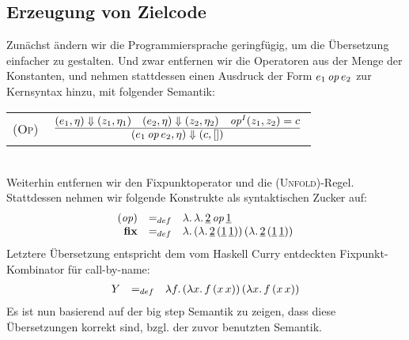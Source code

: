 \documentclass[12pt,fleqn]{article}
\newcommand{\RN}[1]{\mbox{\textsc{(#1)}}}
\begin{document}
\subsection{Erzeugung von Zielcode}

Zun\"achst \"andern wir die Programmiersprache geringf\"ugig, um die \"Ubersetzung einfacher zu gestalten. Und
zwar entfernen wir die Operatoren aus der Menge der Konstanten, und nehmen stattdessen einen Ausdruck der
Form $e_1\,{\text{\it op\/}}\,e_2$ zur Kernsyntax hinzu, mit folgender Semantik: \\[5mm]
\begin{tabular}{ll}
  \RN{Op} & $\regel{(e_1,\eta) \Downarrow (z_1,\eta_1) \quad (e_2,\eta) \Downarrow (z_2,\eta_2)
                    \quad \op^I(z_1,z_2)=c}
                   {(e_1\,\op\,e_2,\eta) \Downarrow (c,[])}$
\end{tabular} \\[5mm]
Weiterhin entfernen wir den Fixpunktoperator und die \RN{Unfold}-Regel. Stattdessen nehmen wir folgende
Konstrukte als syntaktischen Zucker auf:
\[\begin{array}{rcl}
  ({\text{\it op\/}}) &=_{def}& \lambda .\,\lambda .\,\underline{2}\,{\text{\it op\/}}\,\underline{1} \\
  \mathbf{fix} &=_{def}& \lambda .\,(\lambda .\,\underline{2}\,(\underline{1}\,\underline{1}))\,(\lambda .\,\underline{2}\,(\underline{1}\,\underline{1}))
\end{array}\]
Letztere \"Ubersetzung entspricht dem vom Haskell Curry entdeckten Fixpunkt-Kombinator f\"ur call-by-name:
\[\begin{array}{rcl}
  Y &=_{def}& \lambda f.\,(\lambda x.\,f\,(x\,x))\,(\lambda x.\,f\,(x\,x))
\end{array}\]
Es ist nun basierend auf der big step Semantik zu zeigen, dass diese \"Ubersetzungen korrekt sind, bzgl. der
zuvor benutzten Semantik.
\end{document}
